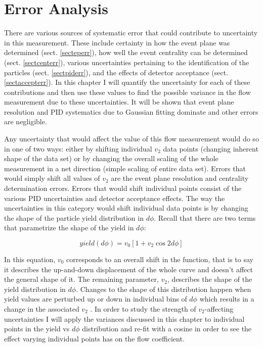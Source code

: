 
\chapter{Error Analysis} %
There are various sources of systematic error that could contribute to uncertainty in this measurement. These include certainty in how the event plane was determined (sect. \ref{secteperr}), how well the event centrality can be determined (sect. \ref{sectcenterr}), various uncertainties pertaining to the identification of the particles (sect. \ref{sectpiderr}), and the effects of detector acceptance (sect. \ref{sectaccepterr}). In this chapter I will quantify the uncertainty for each of these contributions and then use these values to find the possible variance in the flow measurement due to these uncertainties. It will be shown that event plane resolution and PID systematics due to Gaussian fitting dominate and other errors are negligible.

Any uncertainty that would affect the value of this flow measurement would do so in one of two ways: either by shifting individual $v_2$ data points (changing inherent shape of the data set) or by changing the overall scaling of the whole measurement in a net direction (simple scaling of entire data set). Errors that would simply shift all values of $v_2$ are the event plane resolution and centrality determination errors. Errors that would shift individual points consist of the various PID uncertainties and detector acceptance effects. The way the uncertainties in this category would shift individual data points is by changing the shape of the particle yield distribution in $d\phi$. Recall that there are two terms that parametrize the shape of the yield in $d\phi$:

\begin{equation}
yield(d\phi) = v_0 [1 + v_2 \cos 2d\phi]
\end{equation}

In this equation, $v_0$ corresponds to an overall shift in the function, that is to say it describes the up-and-down displacement of the whole curve and doesn't affect the general shape of it. The remaining parameter, $v_2$, describes the shape of the yield distribution in $d\phi$. Changes to the shape of this distribution happen when yield values are perturbed up or down in individual bins of $d\phi$ which results in a change in the associated $v_2$ . In order to study the strength of $v_2$-affecting uncertainties I will apply the variances discussed in this chapter to individual points in the yield vs $d\phi$ distribution and re-fit with a cosine in order to see the effect varying individual points has on the flow coefficient. 

